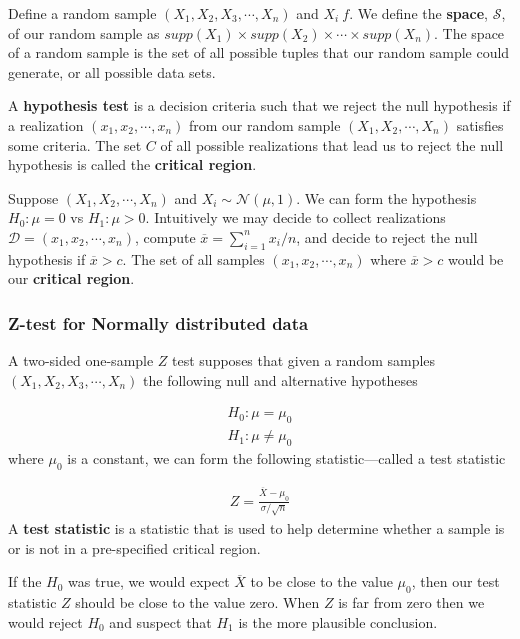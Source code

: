 Define a random sample $(X_{1},X_{2},X_{3},\cdots,X_{n})$ and $X_{i}~f$.
We define the \textbf{space}, $\mathcal{S}$, of our random sample as $supp(X_{1}) \times supp(X_{2}) \times \cdots \times supp(X_{n})$. 
The space of a random sample is the set of all possible tuples that our random sample could generate, or all possible data sets. 

A \textbf{hypothesis test} is a decision criteria such that we reject the null hypothesis if a realization $(x_{1},x_{2},\cdots,x_{n})$ from our random sample $(X_{1},X_{2},\cdots,X_{n})$ satisfies some criteria. 
The set $C$ of all possible realizations that lead us to reject the null hypothesis is called the \textbf{critical region}.

\ex Suppose $(X_{1},X_{2},\cdots,X_{n})$ and $X_{i} \sim \mathcal{N}(\mu,1)$. We can form the hypothesis $H_{0}: \mu=0$ vs $H_{1}: \mu > 0$. Intuitively we may decide to collect realizations $\mathcal{D} = (x_{1},x_{2},\cdots,x_{n})$, compute $\overline{x} = \sum_{i=1}^{n} x_{i} / n$, and decide to reject the null hypothesis if $\overline{x} > c$. The set of all samples $(x_{1},x_{2},\cdots,x_{n})$ where $\overline{x}>c$ would be our \textbf{critical region}.

\subsubsection{Z-test for Normally distributed data}

A two-sided one-sample $Z$ test supposes that given a random samples $(X_{1},X_{2},X_{3},\cdots,X_{n})$ the following
null and alternative hypotheses

\begin{align}
    H_{0}: \mu  = \mu_{0} \\ 
    H_{1}: \mu \neq \mu_{0}
\end{align}
where $\mu_{0}$ is a constant, we can form the following statistic---called a test statistic

\begin{align}
    Z = \frac{\overline{X} - \mu_{0}}{ \sigma / \sqrt{n} }
\end{align}
A \textbf{test statistic} is a statistic that is used to help determine whether a sample is or is not in a pre-specified critical region.

If the $H_{0}$ was true, we would expect $\overline{X}$ to be close to the value $\mu_{0}$, then our test statistic $Z$ should be close to the value zero. When $Z$ is far from zero then we would reject $H_{0}$ and suspect that $H_{1}$ is the more plausible conclusion.

